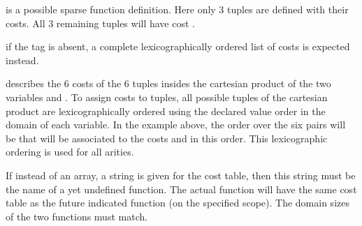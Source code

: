 \documentclass[letterpaper,10pt,openany,oneside,english]{sphinxmanual}
\begin{document}
\sphinxAtStartPar
is a possible sparse function definition. Here only 3 tuples are defined with their costs. All 3 remaining tuples will have cost .

\sphinxAtStartPar
{} if the  tag is absent, a complete lexicographically ordered list of costs is expected instead.

\begin{sphinxVerbatim}[commandchars=\\\{\}]
 \PYG{p}{[}   \PYG{p}{]}
  \PYG{p}{[}     \PYG{p}{]} 
\end{sphinxVerbatim}

\sphinxAtStartPar
describes the 6 costs of the 6 tuples insides the cartesian product of the two variables  and . To assign costs to tuples, all possible tuples of the cartesian product are lexicographically ordered using the declared value order in the domain of each variable.  In the example above, the order over the six pairs will be  that will be associated to the costs  and  in this order. This lexicographic ordering is used for all arities.

\sphinxAtStartPar
{} If instead of an array, a string is given for the cost table, then this string must be the name of a yet undefined function. The actual function will have the same cost table as the future indicated function (on the specified scope). The domain sizes of the two functions must match.

\begin{sphinxVerbatim}[commandchars=\\\{\}]
 \PYG{p}{[}   \PYG{p}{]}
   
\end{sphinxVerbatim}
\end{document}
